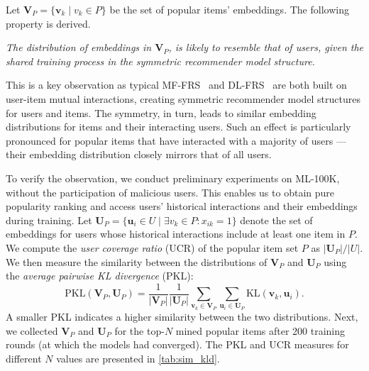 Let $\mathbf{V}_{P}={\{\mathbf{v}_k \mid v_k \in {P}\}}$ be the set of popular items’ embeddings.
The following property is derived.

\begin{property}\label{property_3}
\textit{
The distribution of embeddings in $\mathbf{V}_{P}$, is likely to resemble that of users, given the shared training process in the symmetric recommender model structure.}
\end{property}

This is a key observation as typical MF-FRS~\cite{ammad2019federated,FedRec,FedRec++,9162459} and DL-FRS~\cite{WangYCYZZ22,perifanis2022federated,jiang2022fedncf} are both built on user-item mutual interactions, creating symmetric recommender model structures for users and items. 
The symmetry, in turn, leads to similar embedding distributions for items and their interacting users. Such an effect is particularly pronounced for popular items that have interacted with a majority of users --- their embedding distribution closely mirrors that of all users.

To verify the observation, we conduct preliminary experiments on ML-100K, without the participation of malicious users. 
This enables us to obtain pure popularity ranking and access users' historical interactions and their embeddings during training.
Let $\mathbf{U}_{P}=\{\mathbf{u}_i \in {U} \mid \exists v_k \in {P}: x_{ik} = 1 \}$ denote the set of embeddings for users whose historical interactions include at least one item in ${P}$.
We compute the \emph{user coverage ratio} (UCR) of the popular item set ${P}$ as $|\mathbf{U}_{P}| / |{U}|$.
We then measure the similarity between the distributions of $\mathbf{V}_{P}$ and $\mathbf{U}_{P}$ using the \textit{average pairwise KL divergence} (PKL):
\begin{equation} \label{mean—pair-kld}
\text{PKL}(\mathbf{V}_{P},\mathbf{U}_{P}) = \frac{1}{|\mathbf{V}_{P}|}\frac{1}{|\mathbf{U}_{P}|}\sum\limits_{\mathbf{v}_k\in\mathbf{V}_{P}}\sum\limits_{\mathbf{u}_i\in\mathbf{U}_{P}} \text{KL}(\mathbf{v}_k, \mathbf{u}_i).
\end{equation}
A smaller PKL indicates a higher similarity between the two distributions.
Next, we collected $\mathbf{V}_{P}$ and $\mathbf{U}_{P}$ for the top-$N$ mined popular items after 200 training rounds (at which the models had converged). The PKL and UCR measures for different $N$ values are presented in \cref{tab:sim_kld}.

